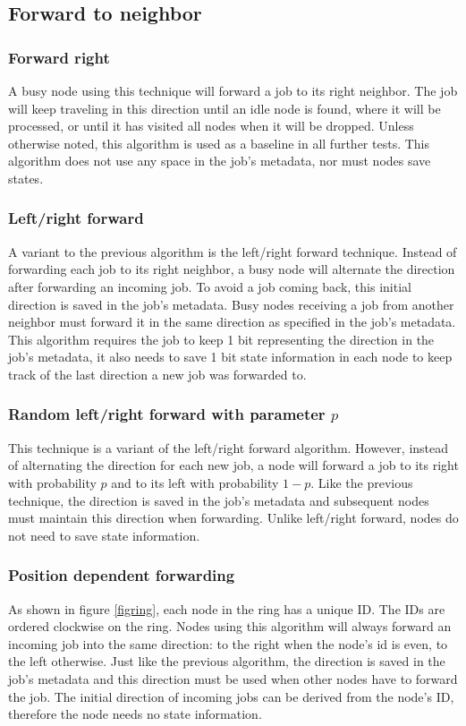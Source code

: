 \documentclass[10pt,a4paper]{article}
\begin{document}
\subsection{Forward to neighbor}
\subsubsection*{Forward right}
A busy node using this technique will forward a job to its right neighbor. The job will keep traveling in this direction until an idle node is found, where it will be processed, or until it has visited all nodes when it will be dropped. Unless otherwise noted, this algorithm is used as a baseline in all further tests. This algorithm does not use any space in the job's metadata, nor must nodes save states.

\subsubsection*{Left/right forward}
A variant to the previous algorithm is the left/right forward technique. Instead of forwarding each job to its right neighbor, a busy node will alternate the direction after forwarding an incoming job. To avoid a job coming back, this initial direction is saved in the job's metadata. Busy nodes receiving a job from another neighbor must forward it in the same direction as specified in the job's metadata. This algorithm requires the job to keep 1 bit representing the direction in the job's metadata, it also needs to save 1 bit state information in each node to keep track of the last direction a new job was forwarded to.

\subsubsection*{Random left/right forward with parameter $p$}
This technique is a variant of the left/right forward algorithm. However, instead of alternating the direction for each new job, a node will forward a job to its right with probability $p$ and to its left with probability $1-p$. Like the previous technique, the direction is saved in the job's metadata and subsequent nodes must maintain this direction when forwarding. Unlike left/right forward, nodes do not need to save state information.

\subsubsection*{Position dependent forwarding}
As shown in figure \ref{figring}, each node in the ring has a unique ID. The IDs are ordered clockwise on the ring. Nodes using this algorithm will always forward an incoming job into the same direction: to the right when the node's id is even, to the left otherwise. Just like the previous algorithm, the direction is saved in the job's metadata and this direction must be used when other nodes have to forward the job. The initial direction of incoming jobs can be derived from the node's ID, therefore the node needs no state information.
\end{document}
